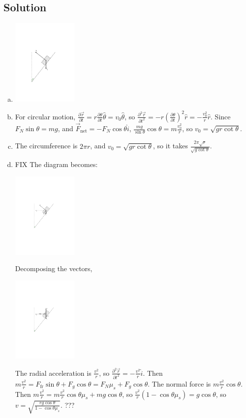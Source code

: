 \documentclass[solutions]{esg8012pset}
\begin{document}
\subsection*{Solution}
  \begin{enumerate}[a)]
    \item \hfil\includegraphics[width=0.25\textwidth]{2009-09-25_Diagram_3}\hfil
    \item For circular motion, $\frac{\partial \vec r}{\partial t} = r\frac{\partial \theta}{\partial t}\hat \theta = v_0 \hat \theta$, so $\frac{\partial^2 \vec r}{\partial t^2} = -r\left(\frac{\partial \theta}{\partial t}\right)^2\hat r = -\frac{v_0^2}{r}\hat r$.  Since $F_N\sin\theta = mg$, and $\vec F_{\text{net}} = -F_N\cos\theta\hat i$, $\frac{mg}{\sin\theta}\cos\theta = m\frac{v_0^2}{r}$, so $v_0 = \sqrt{gr\cot\theta}$.
    \item The circumference is $2\pi r$, and $v_0 = \sqrt{gr\cot\theta}$, so it takes $\frac{2\pi\sqrt{r}}{\sqrt{g\cot\theta}}$.
    \item FIX The diagram becomes: \begin{center}\includegraphics[width=0.25\textwidth]{2009-09-25_Diagram_8}\end{center}  Decomposing the vectors, \begin{center}\includegraphics[width=0.25\textwidth]{2009-09-25_Diagram_9}\end{center}  The radial acceleration is $\frac{v^2}{r}$, so $\frac{\partial^2 \vec r}{\partial t^2} = -\frac{v^2}{r}\hat i$.  Then $m\frac{v^2}{r} = F_{\text{fr}}\sin\theta + F_g\cos\theta = F_N \mu_s + F_g\cos\theta$.  The normal force is $m\frac{v^2}{r}\cos\theta$.  Then $m\frac{v^2}{r} = m\frac{v^2}{r}\cos\theta \mu_s + mg\cos\theta$, so $\frac{v^2}{r}(1 - \cos\theta \mu_s) = g\cos\theta$, so $v = \sqrt{\frac{rg\cos\theta}{1-\cos\theta\mu_s}}$. ???
  \end{enumerate}
\end{document}
